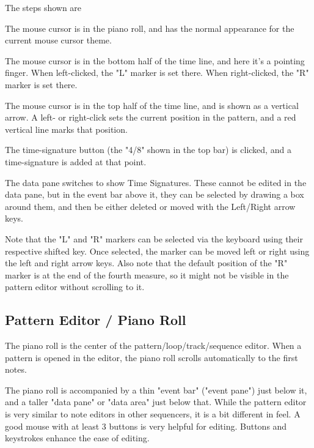    The steps shown are

   \begin{enumber}
      \item The mouse cursor is in the piano roll, and has the normal
         appearance for the current mouse cursor theme.
      \item The mouse cursor is in the bottom half of the time line, and
         here it's a pointing finger.
         When left-clicked, the "L" marker is set there.
         When right-clicked, the "R" marker is set there.
      \item The mouse cursor is in the top half of the time line, and is
         shown as a vertical arrow.
         A left- or right-click sets the current position in the
         pattern, and a red vertical line marks that position.
      \item The time-signature button (the "4/8" shown in the top
         bar) is clicked, and a time-signature is added at that point.
      \item The data pane switches to show Time Signatures.
         These cannot be edited in the data pane, but in the event bar above
         it, they can be selected by drawing a box around them, and then
         be either deleted or moved with the Left/Right arrow keys.
   \end{enumber}

   Note that the "L" and "R" markers can be selected via the keyboard using
   their respective shifted key.  Once selected, the marker can be moved left
   or right using the left and right arrow keys.
   Also note that the default position of the "R" marker is at the end of the
   fourth measure, so it might not be visible in the pattern editor without
   scrolling to it.

\subsection{Pattern Editor / Piano Roll}
\label{subsec:pattern_editor_piano_roll}

   The piano roll is the center of the pattern/loop/track/sequence editor.
   When a pattern is opened in the editor, the piano roll scrolls
   automatically to the first notes.

   The piano roll is accompanied by a thin "event bar"
   ("event pane") just below it,
   and a taller "data pane" or "data area" just below that.
   While the pattern editor is very similar to note editors in other
   sequencers, it is a bit different in feel.  A good mouse with at least 3
   buttons is very helpful for editing.  Buttons and keystrokes enhance the
   ease of editing.

